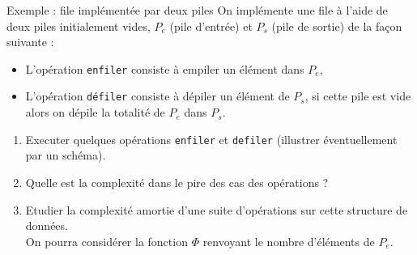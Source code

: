 \documentclass[10pt]{beamer}
\begin{document}
\begin{frame}{\Ctitle}{\stitle}
	\begin{exampleblock}{Exemple : file implémentée par deux piles}
		On implémente une file à l'aide de deux piles initialement vides, $P_e$ (pile d'entrée) et $P_s$ (pile de sortie) de la façon suivante :
		\begin{itemize}
		\item L'opération {\tt enfiler} consiste à empiler un élément dans $P_e$,
		\item L'opération {\tt défiler} consiste à dépiler un élément de $P_s$, si cette pile est vide alors on dépile la totalité de $P_e$ dans $P_s$.
		\end{itemize}
		\begin{enumerate}
		\item<2-> Executer quelques opérations {\tt enfiler} et {\tt defiler} (illustrer éventuellement par un schéma).
		\item<3-> Quelle est la complexité dans le pire des cas des opérations ? 
		\item<4-> Etudier la complexité amortie d'une suite d'opérations sur cette structure de données. \\
		\textcolor{OliveGreen}{\small \aide} On pourra considérer la fonction $\Phi$ renvoyant le nombre d'éléments de $P_e$.
		\end{enumerate}
	\end{exampleblock}
\end{frame}
\end{document}
